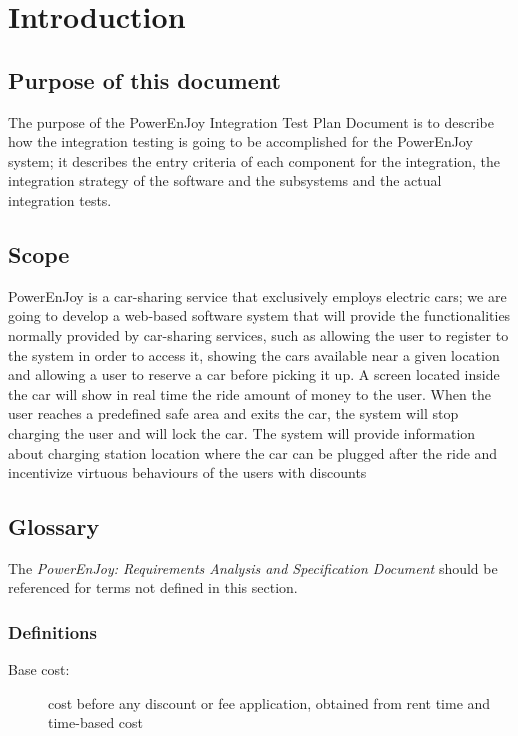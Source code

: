 \section{Introduction}

\subsection{Purpose of this document}
The purpose of the PowerEnJoy Integration Test Plan Document is to describe how the integration testing is going to be accomplished for the PowerEnJoy system; it describes the entry criteria of each component for the integration, the integration strategy of the software and the subsystems and the actual integration tests.

\subsection{Scope}
PowerEnJoy is a car-sharing service that exclusively employs electric cars; we are going to develop a web-based software system that will provide the functionalities normally provided by car-sharing services, such as allowing the user to register to the system in order to access it, showing the cars available near a given location and allowing a user to reserve a car before picking it up.
A screen located inside the car will show in real time the ride amount of money to the user. When the user reaches a predefined safe area and exits the car, the system will stop charging the user and will lock the car. The system will provide information about charging station location where the car can be plugged after the ride and incentivize virtuous behaviours of the users with discounts\cite{RASD}

\subsection{Glossary}
The \emph{PowerEnJoy: Requirements Analysis and Specification Document}\cite{RASD} should be referenced for terms not defined in this section.
\subsubsection{Definitions}
	\begin{description}
		\item [Base cost:] cost before any discount or fee application, obtained from rent time and time-based cost
	\end{description}
